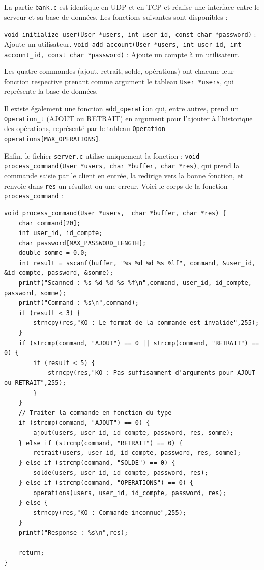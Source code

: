 \documentclass{article}
\begin{document}
La partie \texttt{bank.c} est identique en UDP et en TCP et réalise une interface entre le serveur et sa base de données. Les fonctions suivantes sont disponibles :

\texttt{void initialize_user(User *users, int user_id, const char *password)} : Ajoute un utilisateur.\newline
\texttt{void add_account(User *users, int user_id, int account_id, const char *password)} : Ajoute un compte à un utilisateur.

Les quatre commandes (ajout, retrait, solde, opérations) ont chacune leur fonction respective prenant comme argument le tableau \texttt{User *users}, qui représente la base de données.

Il existe également une fonction \texttt{add_operation} qui, entre autres, prend un \texttt{Operation_t} (AJOUT ou RETRAIT) en argument pour l'ajouter à l'historique des opérations, représenté par le tableau \texttt{Operation operations[MAX_OPERATIONS]}.

Enfin, le fichier \texttt{server.c} utilise uniquement la fonction : \newline
 \texttt{void process_command(User *users, char *buffer, char *res)}, qui prend la commande saisie par le client en entrée, la redirige vers la bonne fonction, et renvoie dans \texttt{res} un résultat ou une erreur.
\newline
Voici le corps de la fonction \texttt{process_command} : 
\begin{verbatim}
void process_command(User *users,  char *buffer, char *res) {
    char command[20];
    int user_id, id_compte;
    char password[MAX_PASSWORD_LENGTH];
    double somme = 0.0; 
    int result = sscanf(buffer, "%s %d %d %s %lf", command, &user_id, &id_compte, password, &somme);
    printf("Scanned : %s %d %d %s %f\n",command, user_id, id_compte, password, somme);
    printf("Command : %s\n",command);
    if (result < 3) {
        strncpy(res,"KO : Le format de la commande est invalide",255);
    } 
    if (strcmp(command, "AJOUT") == 0 || strcmp(command, "RETRAIT") == 0) {
        if (result < 5) {
            strncpy(res,"KO : Pas suffisamment d'arguments pour AJOUT ou RETRAIT",255);
        }
    }
    // Traiter la commande en fonction du type
    if (strcmp(command, "AJOUT") == 0) {
        ajout(users, user_id, id_compte, password, res, somme);
    } else if (strcmp(command, "RETRAIT") == 0) {
        retrait(users, user_id, id_compte, password, res, somme);
    } else if (strcmp(command, "SOLDE") == 0) {
        solde(users, user_id, id_compte, password, res);
    } else if (strcmp(command, "OPERATIONS") == 0) {
        operations(users, user_id, id_compte, password, res);
    } else {
        strncpy(res,"KO : Commande inconnue",255);
    }
    printf("Response : %s\n",res);
    
    return;
}
\end{verbatim}
\end{document}
